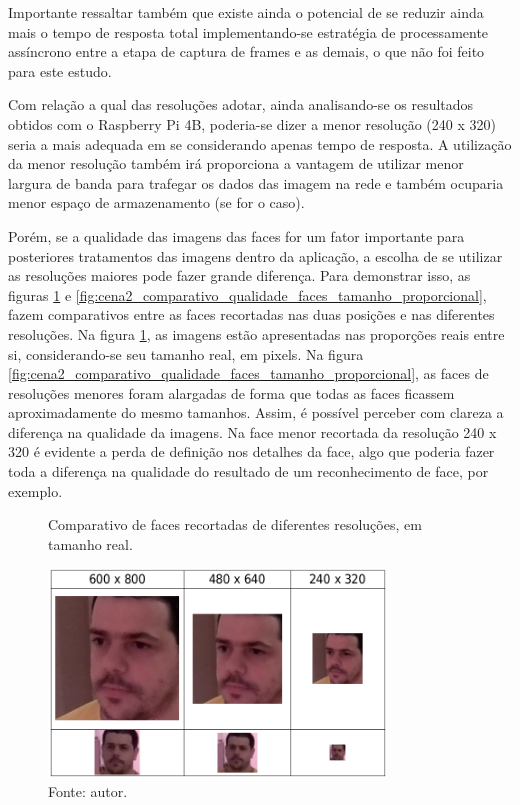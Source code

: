 Importante ressaltar também que existe ainda o potencial de se reduzir ainda mais o tempo de resposta total implementando-se estratégia de processamente assíncrono entre a etapa de captura de frames e as demais, o que não foi feito para este estudo.

Com relação a qual das resoluções adotar, ainda analisando-se os resultados obtidos com o Raspberry Pi 4B, poderia-se dizer a menor resolução (240 x 320) seria a mais adequada em se considerando apenas tempo de resposta. A utilização da menor resolução também irá proporciona a vantagem de utilizar menor largura de banda para trafegar os dados das imagem na rede e também ocuparia menor espaço de armazenamento (se for o caso).

Porém, se a qualidade das imagens das faces for um fator importante para posteriores tratamentos das imagens dentro da aplicação, a escolha de se utilizar as resoluções maiores pode fazer grande diferença. Para demonstrar isso, as figuras \ref{fig:cena2_comparativo_qualidade_faces_tamanho_real} e \ref{fig:cena2_comparativo_qualidade_faces_tamanho_proporcional}, fazem comparativos entre as faces recortadas nas duas posições e nas diferentes resoluções. Na figura \ref{fig:cena2_comparativo_qualidade_faces_tamanho_real}, as imagens estão apresentadas nas proporções reais entre si, considerando-se seu tamanho real, em pixels. Na figura \ref{fig:cena2_comparativo_qualidade_faces_tamanho_proporcional}, as faces de resoluções menores foram alargadas de forma que todas as faces ficassem aproximadamente do mesmo tamanhos. Assim, é possível perceber com clareza a diferença na qualidade da imagens. Na face menor recortada da resolução 240 x 320 é evidente a perda de definição nos detalhes da face, algo que poderia fazer toda a diferença na qualidade do resultado de um reconhecimento de face, por exemplo.

\begin{figure}[h]
    \centering
    \caption[Comparativo de faces recortadas de diferentes resoluções, em tamanho real.]{Comparativo de faces recortadas de diferentes resoluções, em tamanho real.}
    \includegraphics[width=0.8\textwidth]{Cap4_Experimentos_Realizados/Figures/cena2_comparativo_qualidade_faces_recortadas_tamanho_real.jpg}
    \caption*{Fonte: autor.}
    \label{fig:cena2_comparativo_qualidade_faces_tamanho_real}
\end{figure}

